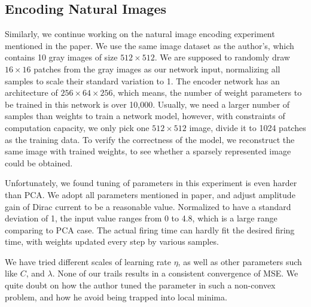 \subsection{Encoding Natural Images}
Similarly, we continue working on the natural image encoding experiment mentioned in the paper. We use the same image dataset as the author's, which contains 10 gray images of size $512 \times 512$. We are supposed to randomly draw $16 \times 16$ patches from the gray images as our network input, normalizing all samples to scale their standard variation to 1. The encoder network has an architecture of $256\times 64 \times 256$, which means, the number of weight parameters to be trained in this network is over 10,000. Usually, we need a larger number of samples than weights to train a network model, however, with constraints of computation capacity, we only pick one $512 \times 512$ image, divide it to 1024 patches as the training data. To verify the correctness of the model, we reconstruct the same image with trained weights, to see whether a sparsely represented image could be obtained.

Unfortunately, we found tuning of parameters in this experiment is even harder than PCA. We adopt all parameters mentioned in paper, and adjust amplitude gain of Dirac current to be a reasonable value. Normalized to have a standard deviation of 1, the input value ranges from 0 to 4.8, which is a large range comparing to PCA case. The actual firing time can hardly fit the desired firing time, with weights updated every step by various samples.

We have tried different scales of learning rate $\eta$, as well as other parameters such like $C$, and $\lambda$. None of our trails results in a consistent convergence of MSE. We quite doubt on how the author tuned the parameter in such a non-convex problem, and how he avoid being trapped into local minima.

